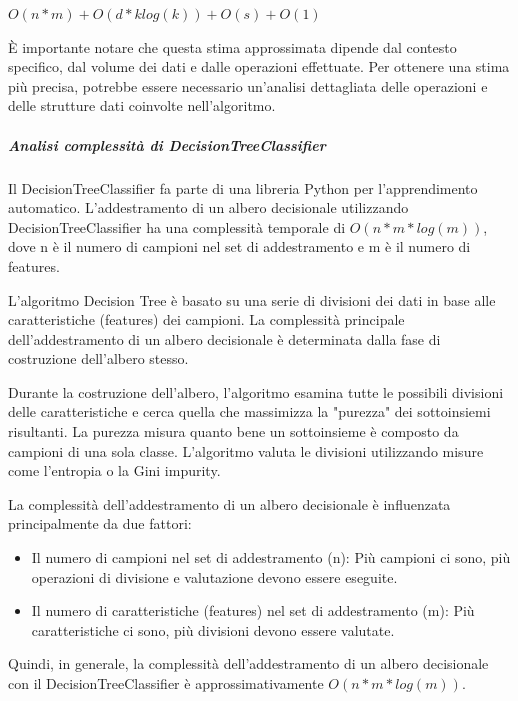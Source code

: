 \boldmath
\begin{center}
    \BlankLine
    $O(n * m) + O(d * k log(k)) + O(s) + O(1)$
    \BlankLine
\end{center}
\unboldmath


È importante notare che questa stima approssimata dipende dal contesto specifico, dal volume dei dati e dalle 
operazioni effettuate. Per ottenere una stima più precisa, potrebbe essere necessario un'analisi dettagliata 
delle operazioni e delle strutture dati coinvolte nell'algoritmo.


\vspace{1cm}
\subparagraph{Analisi complessità di \textit{DecisionTreeClassifier}}
Il DecisionTreeClassifier fa parte di una libreria Python per l'apprendimento 
automatico. L'addestramento di un albero decisionale utilizzando DecisionTreeClassifier 
ha una complessità temporale di $O(n * m * log(m))$, dove n è il numero di 
campioni nel set di addestramento e m è il numero di features.

L'algoritmo Decision Tree è basato su una serie di divisioni dei dati 
in base alle caratteristiche (features) dei campioni. La complessità principale 
dell'addestramento di un albero decisionale è determinata dalla fase di costruzione 
dell'albero stesso.

Durante la costruzione dell'albero, l'algoritmo esamina tutte le possibili 
divisioni delle caratteristiche e cerca quella che massimizza la "purezza" dei 
sottoinsiemi risultanti. La purezza misura quanto bene un sottoinsieme è composto 
da campioni di una sola classe. L'algoritmo valuta le divisioni utilizzando misure 
come l'entropia o la Gini impurity.

La complessità dell'addestramento di un albero decisionale è influenzata 
principalmente da due fattori:
\begin{itemize}
    \item Il numero di campioni nel set di addestramento (n): Più campioni ci sono, 
        più operazioni di divisione e valutazione devono essere eseguite.
    \item Il numero di caratteristiche (features) nel set di addestramento (m): 
        Più caratteristiche ci sono, più divisioni devono essere valutate.


\end{itemize}
Quindi, in generale, la complessità dell'addestramento di un albero decisionale 
con il DecisionTreeClassifier è approssimativamente $O(n * m * log(m))$.


\vspace{1cm}

